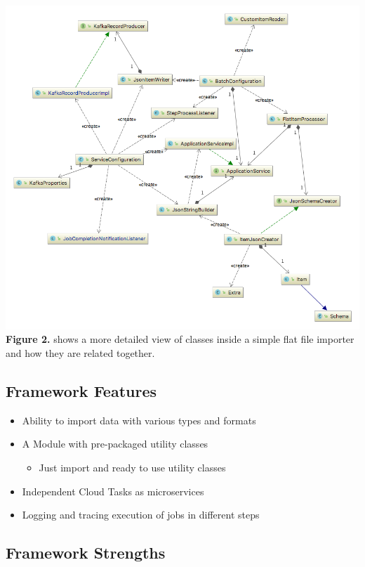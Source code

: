 \includegraphics[width=1.00\textwidth]{images/domain_model.png} \textbf{Figure 2.} shows a
more detailed view of classes inside a simple flat file importer and how
they are related together.

\subsection{Framework Features}\label{framework-features}

\begin{itemize}
\tightlist
\item
  Ability to import data with various types and formats
\item
  A Module with pre-packaged utility classes

  \begin{itemize}
  \tightlist
  \item
    Just import and ready to use utility classes
  \end{itemize}
\item
  Independent Cloud Tasks as microservices
\item
  Logging and tracing execution of jobs in different steps
\end{itemize}

\subsection{Framework Strengths}\label{framework-strengths}


